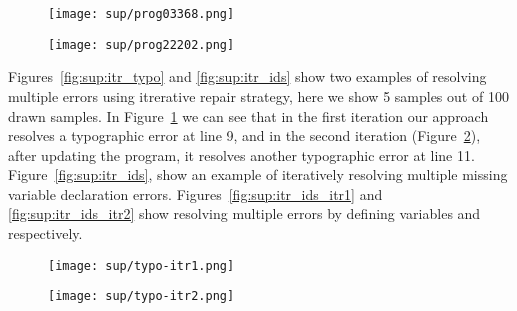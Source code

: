 \documentclass[letterpaper]{article} \usepackage{aaai20}  \usepackage{times}  \usepackage{helvet} \usepackage{courier}  \usepackage[hyphens]{url}  \usepackage{graphicx}
\newcommand{\dssmaplefix}{DS-SampleFix}
\newcommand{\figref}{Figure}
\newcommand{\figsref}{Figures}
\begin{document}
\begin{figure*}[h]
	\begin{subfigure}[b]{0.49\textwidth}
	    \centering
		\texttt{[image: sup/prog03368.png]}
		\caption{}
	\end{subfigure}
	\begin{subfigure}[b]{0.49\textwidth}
	    \centering
		\texttt{[image: sup/prog22202.png]}
		\caption{}
	\end{subfigure}
	\caption{Example programs with missing variable declaration errors. The potential location of the error is highlighted. Our DS-SampleFix generates multiple candidate fixes which attempt to declare variables (correct fix with green tick). DeepFix is unable to generate any fix.}
	\label{fig:sup:example3}
	\vspace{-.1cm}
\end{figure*}

\figsref \, \ref{fig:sup:itr_typo} and \ref{fig:sup:itr_ids} show two examples of resolving multiple errors using itrerative repair strategy, here we show 5 samples out of 100 drawn samples. In \figref \, \ref{fig:sup:itr_typo_itr1} we can see that in the first iteration our approach resolves a typographic error at line 9, and in the second iteration (\figref \, \ref{fig:sup:itr_typo_itr2}), after updating the program, it resolves another typographic error at line 11. \figref \, \ref{fig:sup:itr_ids}, show an example of iteratively resolving multiple missing variable declaration errors. \figsref \, \ref{fig:sup:itr_ids_itr1} and \ref{fig:sup:itr_ids_itr2} show resolving multiple errors by defining variables  and  respectively. 




\begin{figure*}[h] 
	\centering
	\begin{subfigure}[b]{0.49\textwidth}
	    \centering
		\texttt{[image: sup/typo-itr1.png]}
		\caption{ }
		\label{fig:sup:itr_typo_itr1}
	\end{subfigure} \hfill
	\begin{subfigure}[b]{0.49\textwidth}
	    \centering
		\texttt{[image: sup/typo-itr2.png]} 
		\caption{}
		\label{fig:sup:itr_typo_itr2}
	\end{subfigure} 
	\caption{An example of iteratively resolving multiple typographic errors using our approach (\dssmaplefix).}
	\label{fig:sup:itr_typo}
	\vspace{-.1cm}
\end{figure*}
\end{document}
